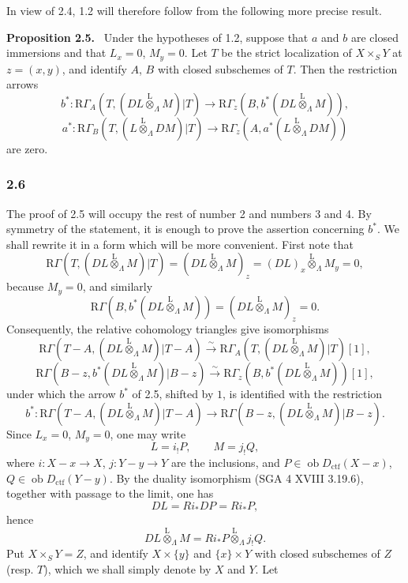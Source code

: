 \documentclass[11pt]{article}
\newenvironment{statement}[1]{\par\medskip\noindent\textbf{#1.}\ }{\par\medskip}
\providecommand{\lten}{\overset{\mathrm L}{\otimes}}
\providecommand{\Ob}{\operatorname{ob}}
\providecommand{\lten}{\overset{\mathrm L}{\otimes}}
\providecommand{\lten}{\overset{\mathrm L}{\otimes}}
\providecommand{\Ob}{\operatorname{ob}}
\providecommand{\lten}{\overset{\mathrm L}{\otimes}}
\providecommand{\lten}{\overset{\mathrm L}{\otimes}}
\providecommand{\Ob}{\operatorname{Ob}}
\providecommand{\lten}{\overset{\mathrm L}{\otimes}}
\begin{document}
In view of 2.4, 1.2 will therefore follow from the following more precise result.

\begin{statement}{Proposition 2.5}
Under the hypotheses of 1.2, suppose that $a$ and $b$ are closed immersions and that $L_x=0$, $M_y=0$. Let $T$ be the strict localization of $X\times_SY$ at $z=(x,y)$, and identify $A$, $B$ with closed subschemes of $T$. Then the restriction arrows
\[
b^*:\mathrm R\Gamma_A(T,(DL\lten_{\Lambda}M)|T)
 \longrightarrow \mathrm R\Gamma_z(B,b^*(DL\lten_{\Lambda}M)),
\]
\[
a^*:\mathrm R\Gamma_B(T,(L\lten_{\Lambda}DM)|T)
 \longrightarrow \mathrm R\Gamma_z(A,a^*(L\lten_{\Lambda}DM))
\]
are zero.
\end{statement}

\subsubsection*{2.6}
The proof of 2.5 will occupy the rest of number 2 and numbers 3 and 4. By symmetry of the statement, it is enough to prove the assertion concerning $b^*$. We shall rewrite it in a form which will be more convenient. First note that
\[
\mathrm R\Gamma(T,(DL\lten_{\Lambda}M)|T)
 =(DL\lten_{\Lambda}M)_z
 =(DL)_x\lten_{\Lambda}M_y=0,
\]
because $M_y=0$, and similarly
\[
\mathrm R\Gamma(B,b^*(DL\lten_{\Lambda}M))
 =(DL\lten_{\Lambda}M)_z=0.
\]
Consequently, the relative cohomology triangles give isomorphisms
\[
\mathrm R\Gamma(T-A,(DL\lten_{\Lambda}M)|T-A)
 \xrightarrow{\sim}
\mathrm R\Gamma_A(T,(DL\lten_{\Lambda}M)|T)[1],
\]
\[
\mathrm R\Gamma(B-z,b^*(DL\lten_{\Lambda}M)|B-z)
 \xrightarrow{\sim}
\mathrm R\Gamma_z(B,b^*(DL\lten_{\Lambda}M))[1],
\]
under which the arrow $b^*$ of 2.5, shifted by $1$, is identified with the restriction
\begin{equation}
b^*:\mathrm R\Gamma(T-A,(DL\lten_{\Lambda}M)|T-A)
 \longrightarrow \mathrm R\Gamma(B-z,(DL\lten_{\Lambda}M)|B-z).
\tag{2.6.1}
\end{equation}
Since $L_x=0$, $M_y=0$, one may write
\begin{equation}
L=i_!P,\qquad M=j_!Q,
\tag{2.6.2}
\end{equation}
where $i:X-x\to X$, $j:Y-y\to Y$ are the inclusions, and $P\in\Ob D_{\mathrm{ctf}}(X-x)$, $Q\in\Ob D_{\mathrm{ctf}}(Y-y)$. By the duality isomorphism (SGA 4 XVIII 3.19.6), together with passage to the limit, one has
\[
DL=Ri_*DP=Ri_*P,
\]
hence
\[
DL\lten_{\Lambda}M=Ri_*P\lten_{\Lambda}j_!Q.
\]
Put $X\times_SY=Z$, and identify $X\times\{y\}$ and $\{x\}\times Y$ with closed subschemes of $Z$ (resp. $T$), which we shall simply denote by $X$ and $Y$. Let
\end{document}
